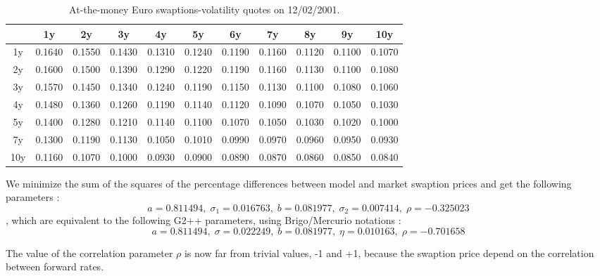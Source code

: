 \documentclass[12pt,a4paper]{article}
\begin{document}
\begin{table}[''h'']
   \centering
    \begin{tabular}{|c|c|c|c|c|c|c|c|c|c|c|}
    \hline
    & 1y & 2y & 3y & 4y & 5y & 6y & 7y & 8y & 9y & 10y\\
    \hline
    1y & 0.1640 & 0.1550 & 0.1430 & 0.1310 & 0.1240 & 0.1190 & 0.1160 & 0.1120 & 0.1100 & 0.1070 \\
    2y & 0.1600 & 0.1500 & 0.1390 & 0.1290 & 0.1220 & 0.1190 & 0.1160 & 0.1130 & 0.1100 & 0.1080 \\
    3y & 0.1570 & 0.1450 & 0.1340 & 0.1240 & 0.1190 & 0.1150 & 0.1130 & 0.1100 & 0.1080 & 0.1060 \\
    4y & 0.1480 & 0.1360 & 0.1260 & 0.1190 & 0.1140 & 0.1120 & 0.1090 & 0.1070 & 0.1050 & 0.1030 \\
    5y & 0.1400 & 0.1280 & 0.1210 & 0.1140 & 0.1100 & 0.1070 & 0.1050 & 0.1030 & 0.1020 & 0.1000 \\
    7y & 0.1300 & 0.1190 & 0.1130 & 0.1050 & 0.1010 & 0.0990 & 0.0970 & 0.0960 & 0.0950 & 0.0930 \\
    10y & 0.1160 & 0.1070 & 0.1000 & 0.0930 & 0.0900 & 0.0890 & 0.0870 & 0.0860 & 0.0850 & 0.0840 \\
    \hline
\end{tabular}
\caption{\label{''swaption data''} At-the-money Euro swaptions-volatility quotes on 12/02/2001. }
\end{table}

We minimize the sum of the squares of the percentage differences between model and market swaption prices and get the following parameters :
$$a = 0.811494,\; \sigma_1 = 0.016763,\; b = 0.081977,\;  \sigma_2 = 0.007414,\; \rho = -0.325023 $$
, which are equivalent to the following G2++ parameters, using Brigo/Mercurio notations :
$$a = 0.811494,\; \sigma = 0.022249,\; b = 0.081977,\;  \eta = 0.010163,\; \rho = -0.701658 $$

The value of the correlation parameter $\rho$ is now far from trivial values, -1 and +1, because the swaption price depend on the correlation between forward rates.\\
\end{document}

